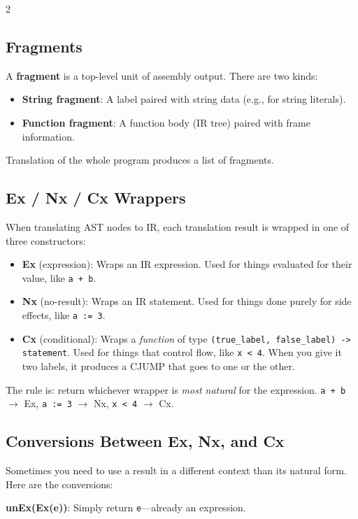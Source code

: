 \documentclass[9pt,landscape]{extarticle}
\begin{document}
\begin{multicols}{2}
\subsection{Fragments}

A \textbf{fragment} is a top-level unit of assembly output. There are two kinds:
\begin{itemize}
  \item \textbf{String fragment}: A label paired with string data (e.g., for string literals).
  \item \textbf{Function fragment}: A function body (IR tree) paired with frame information.
\end{itemize}
Translation of the whole program produces a list of fragments.

\subsection{Ex / Nx / Cx Wrappers}

When translating AST nodes to IR, each translation result is wrapped in one of three constructors:
\begin{itemize}
  \item \textbf{Ex} (expression): Wraps an IR expression. Used for things evaluated for their value, like \texttt{a + b}.
  \item \textbf{Nx} (no-result): Wraps an IR statement. Used for things done purely for side effects, like \texttt{a := 3}.
  \item \textbf{Cx} (conditional): Wraps a \emph{function} of type \texttt{(true\_label, false\_label) -> statement}. Used for things that control flow, like \texttt{x < 4}. When you give it two labels, it produces a CJUMP that goes to one or the other.
\end{itemize}

The rule is: return whichever wrapper is \emph{most natural} for the expression. \texttt{a + b} $\to$ Ex, \texttt{a := 3} $\to$ Nx, \texttt{x < 4} $\to$ Cx.

\subsection{Conversions Between Ex, Nx, and Cx}

Sometimes you need to use a result in a different context than its natural form. Here are the conversions:

\textbf{unEx(Ex(e))}: Simply return \texttt{e}---already an expression.


\end{multicols}
\end{document}
